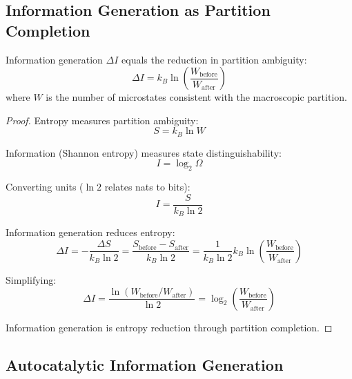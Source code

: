 \subsection{Information Generation as Partition Completion}

\begin{theorem}
\label{thm:info_partition}
Information generation $\Delta I$ equals the reduction in partition ambiguity:
\begin{equation}
\Delta I = k_B \ln\left(\frac{W_{\text{before}}}{W_{\text{after}}}\right)
\end{equation}
where $W$ is the number of microstates consistent with the macroscopic partition.
\end{theorem}

\begin{proof}
Entropy measures partition ambiguity:
\begin{equation}
S = k_B \ln W
\end{equation}

Information (Shannon entropy) measures state distinguishability:
\begin{equation}
I = \log_2 \Omega
\end{equation}

Converting units ($\ln 2$ relates nats to bits):
\begin{equation}
I = \frac{S}{k_B \ln 2}
\end{equation}

Information generation reduces entropy:
\begin{equation}
\Delta I = -\frac{\Delta S}{k_B \ln 2} = \frac{S_{\text{before}} - S_{\text{after}}}{k_B \ln 2} = \frac{1}{k_B \ln 2} k_B \ln\left(\frac{W_{\text{before}}}{W_{\text{after}}}\right)
\end{equation}

Simplifying:
\begin{equation}
\Delta I = \frac{\ln(W_{\text{before}}/W_{\text{after}})}{\ln 2} = \log_2\left(\frac{W_{\text{before}}}{W_{\text{after}}}\right)
\end{equation}

Information generation is entropy reduction through partition completion.
\end{proof}

\subsection{Autocatalytic Information Generation}

